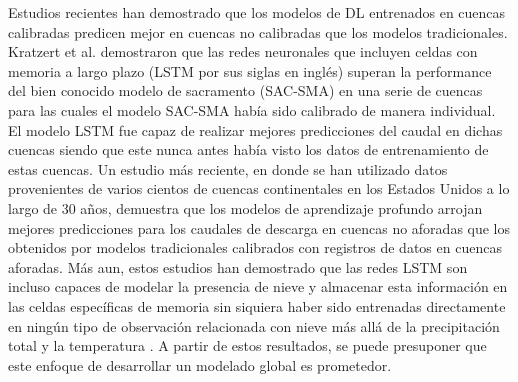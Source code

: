 Estudios recientes han demostrado que los modelos
de DL entrenados en cuencas calibradas predicen mejor en cuencas no calibradas que los modelos tradicionales.
Kratzert et al. \cite{Kratzert2} demostraron que las redes neuronales que incluyen celdas con memoria a largo plazo 
(LSTM por sus siglas en inglés) superan la performance del bien conocido modelo de sacramento (SAC-SMA) \cite{sac1} \cite{sac2}
en una serie de cuencas para las cuales el modelo SAC-SMA había sido calibrado de manera individual.  
El modelo LSTM fue capaz de realizar mejores predicciones del caudal en dichas cuencas siendo que este nunca antes había visto
los datos de entrenamiento de estas cuencas. 
Un estudio más reciente\cite{nearing}\cite{Kratzert}, en donde se han utilizado datos provenientes de varios cientos de cuencas 
continentales en los Estados Unidos a lo largo de 30 años, demuestra que los modelos de aprendizaje profundo arrojan 
mejores predicciones para los caudales de descarga en cuencas no aforadas que los obtenidos por modelos tradicionales 
calibrados con registros de datos en cuencas aforadas. 
Más aun, estos estudios han demostrado que las redes LSTM son incluso capaces de modelar la presencia de nieve y 
almacenar esta información en las celdas específicas de memoria sin siquiera haber sido entrenadas directamente en 
ningún tipo de observación relacionada con nieve más allá de la precipitación total y la temperatura \cite{Kratzert2}.
A partir de estos resultados, se puede presuponer que este enfoque de desarrollar
un modelado global es prometedor. 






